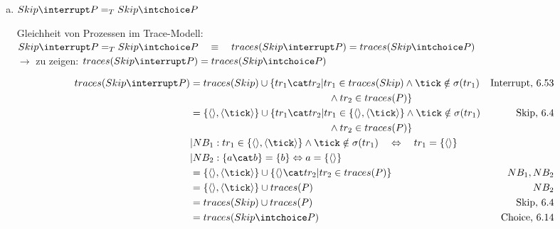\documentclass{scrreprt}
\begin{document}
\begin{enumerate}[a)]
\item{
  $ Skip \interrupt P =_T Skip \intchoice P $

  Gleichheit von Prozessen im Trace-Modell:\\
  $Skip \interrupt P =_T Skip \intchoice P \hspace{10pt} \equiv \hspace{10pt} traces(Skip \interrupt P) = traces(Skip \intchoice P) $ \\

  $\rightarrow$ zu zeigen: $traces(Skip \interrupt P) = traces(Skip \intchoice P)$

  \begin{align*}
    traces(Skip \interrupt P) &= traces(Skip) \cup \{tr_1 \cat tr_2 | tr_1 \in traces(Skip) \wedge \tick \notin \sigma(tr_1) & \text{Interrupt, 6.53}\\
                              &\hspace{4.9cm} \wedge tr_2 \in traces(P) \}\\
                              &= \{ \langle \rangle, \langle \tick \rangle \} \cup \{ tr_1 \cat tr_2 | tr_1 \in \{ \langle \rangle, \langle \tick \rangle \} \wedge \tick \notin \sigma(tr_1) & \text{Skip, 6.4}\\
                              &\hspace{4.9cm} \wedge tr_2 \in traces(P) \}\\
                              &|NB_1: tr_1 \in \{ \langle \rangle, \langle \tick \rangle \} \wedge \tick \notin \sigma(tr_1) \hspace{10pt} \Leftrightarrow \hspace{10pt} tr_1 = \{ \langle \rangle \}\\
                              &|NB_2: \{a \cat b\} = \{ b \} \Leftrightarrow a = \{ \langle \rangle \}\\
                              &= \{ \langle \rangle, \langle \tick \rangle \} \cup \{ \langle \rangle \cat tr_2 | tr_2 \in traces(P) \} & NB_1, NB_2\\
                              &= \{ \langle \rangle, \langle \tick \rangle \} \cup traces(P) & NB_2\\
                              &= traces(Skip) \cup traces(P) & \text{Skip, 6.4}\\
                              &= traces(Skip \intchoice P) & \text{Choice, 6.14}\\
  \end{align*}

  \flushright{\qedsymbol}\\
}
\end{enumerate}
\end{document}
